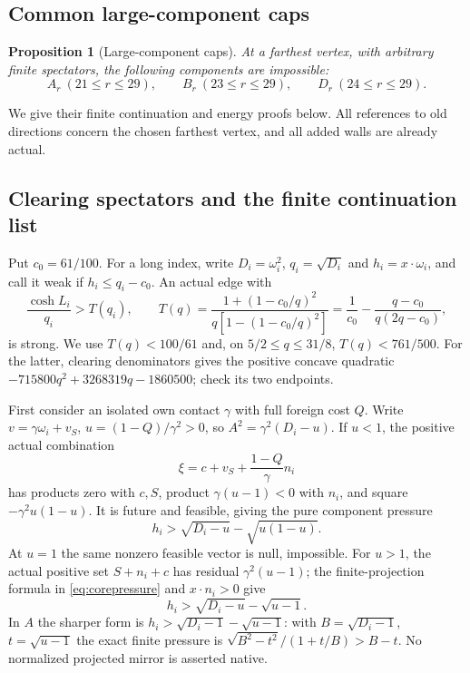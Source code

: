 \documentclass[11pt]{article}
\newtheorem{proposition}[theorem]{Proposition}
\theoremstyle{definition}
\theoremstyle{remark}
\begin{document}
\subsection{Common large-component caps}
\begin{proposition}[Large-component caps]\label{app:tail:prop:caps}
At a farthest vertex, with arbitrary finite spectators, the following
components are impossible:
\[
 A_r\ (21\le r\le29),\qquad B_r\ (23\le r\le29),\qquad
 D_r\ (24\le r\le29).
\]
\end{proposition}

We give their finite continuation and energy proofs below. All references to old directions concern the
chosen farthest vertex, and all added walls are already actual.

\subsection{Clearing spectators and the finite continuation list}
\label{app:tail:sec:capinventory}

Put $c_0=61/100$. For a long index, write $D_i=\omega_i^2$,
$q_i=\sqrt{D_i}$ and $h_i=x\cdot\omega_i$, and call it weak if
$h_i\le q_i-c_0$. An actual edge with
\[
 \frac{\cosh L_i}{q_i}>T(q_i),\qquad
 T(q)=\frac{1+(1-c_0/q)^2}{q[1-(1-c_0/q)^2]}
      =\frac1{c_0}-\frac{q-c_0}{q(2q-c_0)},
\]
is strong. We use $T(q)<100/61$ and, on $5/2\le q\le31/8$,
$T(q)<761/500$. For the latter, clearing denominators gives the
positive concave quadratic
$-715800q^2+3268319q-1860500$; check its two endpoints.

First consider an isolated own contact $\gamma$ with full foreign
cost $Q$. Write $v=\gamma\omega_i+v_S$,
$u=(1-Q)/\gamma^2>0$, so $A^2=\gamma^2(D_i-u)$.
If $u<1$, the positive actual combination
\[
 \xi=c+v_S+\frac{1-Q}{\gamma}n_i
\]
has products zero with $c,S$, product $\gamma(u-1)<0$ with $n_i$,
and square $-\gamma^2u(1-u)$. It is future and feasible, giving
the pure component pressure
\begin{equation}\label{app:tail:eq:clearforeign}
 h_i>\sqrt{D_i-u}-\sqrt{u(1-u)}.
\end{equation}
At $u=1$ the same nonzero feasible vector is null, impossible.
For $u>1$, the actual positive set $S+n_i+c$ has residual
$\gamma^2(u-1)$; the finite-projection formula in \eqref{eq:corepressure} and $x\cdot n_i>0$ give
\begin{equation}\label{app:tail:eq:clearfinite}
 h_i>\sqrt{D_i-u}-\sqrt{u-1}.
\end{equation}
In $A$ the sharper form is $h_i>\sqrt{D_i-1}-\sqrt{u-1}$:
with $B=\sqrt{D_i-1}$, $t=\sqrt{u-1}$ the exact finite pressure
is $\sqrt{B^2-t^2}/(1+t/B)>B-t$.
No normalized projected mirror is asserted native.
\end{document}
